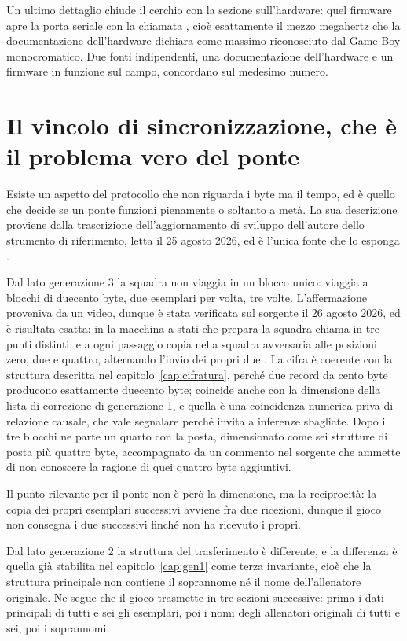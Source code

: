 Un ultimo dettaglio chiude il cerchio con la sezione sull'hardware: quel firmware apre la porta seriale con la chiamata , cioè esattamente il mezzo megahertz che la documentazione dell'hardware dichiara come massimo riconosciuto dal Game Boy monocromatico. Due fonti indipendenti, una documentazione dell'hardware e un firmware in funzione sul campo, concordano sul medesimo numero.

\section{Il vincolo di sincronizzazione, che è il problema vero del ponte}

Esiste un aspetto del protocollo che non riguarda i byte ma il tempo, ed è quello che decide se un ponte funzioni pienamente o soltanto a metà. La sua descrizione proviene dalla trascrizione dell'aggiornamento di sviluppo dell'autore dello strumento di riferimento, letta il 25 agosto 2026, ed è l'unica fonte che lo esponga \cite{devlog-ptgb}.

Dal lato generazione 3 la squadra non viaggia in un blocco unico: viaggia a blocchi di duecento byte, due esemplari per volta, tre volte. L'affermazione proveniva da un video, dunque è stata verificata sul sorgente il 26 agosto 2026, ed è risultata esatta: in  la macchina a stati che prepara la squadra chiama  in tre punti distinti, e a ogni passaggio copia  nella squadra avversaria alle posizioni zero, due e quattro, alternando l'invio dei propri due \cite{pokefirered}. La cifra è coerente con la struttura descritta nel capitolo~\ref{cap:cifratura}, perché due record da cento byte producono esattamente duecento byte; coincide anche con la dimensione della lista di correzione di generazione 1, e quella è una coincidenza numerica priva di relazione causale, che vale segnalare perché invita a inferenze sbagliate. Dopo i tre blocchi ne parte un quarto con la posta, dimensionato come sei strutture di posta più quattro byte, accompagnato da un commento nel sorgente che ammette di non conoscere la ragione di quei quattro byte aggiuntivi.

Il punto rilevante per il ponte non è però la dimensione, ma la reciprocità: la copia dei propri esemplari successivi avviene fra due ricezioni, dunque il gioco non consegna i due successivi finché non ha ricevuto i propri.

Dal lato generazione 2 la struttura del trasferimento è differente, e la differenza è quella già stabilita nel capitolo~\ref{cap:gen1} come terza invariante, cioè che la struttura principale non contiene il soprannome né il nome dell'allenatore originale. Ne segue che il gioco trasmette in tre sezioni successive: prima i dati principali di tutti e sei gli esemplari, poi i nomi degli allenatori originali di tutti e sei, poi i soprannomi.

